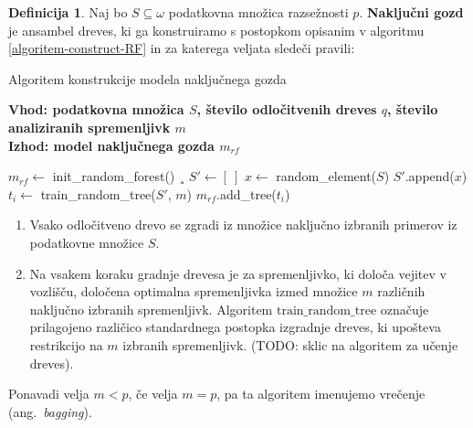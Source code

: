 \documentclass[12pt,a4paper,twoside]{article}
\theoremstyle{definition} %
\newtheorem{definicija}{Definicija}[section]
\theoremstyle{plain} %
\numberwithin{equation}{section}  %
\begin{document}
\begin{definicija}
Naj bo $S \subseteq \omega$ podatkovna množica razsežnosti $p$.
\textbf{Naključni gozd} je ansambel dreves, ki ga konstruiramo s postopkom opisanim v algoritmu \ref{algoritem-construct-RF} in za katerega veljata sledeči pravili:
%
\begin{algorithm}[ht]
	\caption{Algoritem konstrukcije modela naključnega gozda}
	\label{algoritem-construct-RF}
	\raggedright
	\textbf{Vhod: podatkovna množica $S$, število odločitvenih dreves $q$, število analiziranih spremenljivk $m$}  \\
	\textbf{Izhod: model naključnega gozda $m_{rf}$} 
	\begin{algorithmic}[0]
	  \State $m_{rf} \gets $ init\_random\_forest()
  ¸	\State $S' \gets [\ ]$
		  \State $x \gets$ random\_element($S$)
		  \State $S'$.append($x$)
	  \EndFor
	  \State $t_i \gets $ train\_random\_tree($S'$, $m$)
	  \State $m_{rf}$.add\_tree($t_i$)
	  \EndFor
	\end{algorithmic}
\end{algorithm}
%
\begin{enumerate}
\item Vsako odločitveno drevo se zgradi iz množice naključno izbranih primerov iz podatkovne množice $S$.

\item Na vsakem koraku gradnje drevesa je za spremenljivko, ki določa vejitev v vozlišču, določena optimalna spremenljivka izmed množice $m$ različnih naključno izbranih spremenljivk. 
Algoritem $\mathrm{train\_random\_tree}$ označuje prilagojeno različico standardnega postopka izgradnje dreves, ki upošteva restrikcijo na $m$ izbranih spremenljivk. (TODO: sklic na algoritem za učenje dreves). 
\end{enumerate}
%
Ponavadi velja $m < p$, če velja $m=p$, pa ta algoritem imenujemo vrečenje (ang.~\textsl{bagging}).
\end{definicija}

\end{document}
